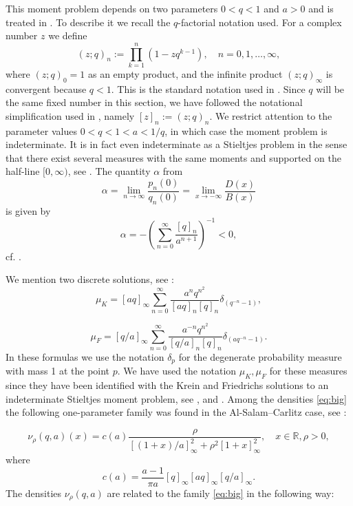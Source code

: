 \documentclass [12pt]{article}
\newcommand{\R}{\mathbb{R}}
\begin{document}
This moment problem depends on two parameters $0<q<1$ and $a>0$ and is treated in \cite{B:V}. To describe it we recall the $q$-factorial notation  used. For a complex number $z$ we define
\begin{equation}
(z;q)_n:=\prod_{k=1}^n(1-zq^{k-1}), \quad n=0,1,\ldots,\infty,
\end{equation}
where $(z;q)_0=1$ as an empty product, and the infinite product $(z;q)_\infty$ is convergent because $q<1$. This is the standard notation used in \cite{G:R}. Since $q$  will be the same fixed number in this section, we have followed the notational simplification used in \cite{B:V}, namely $[z]_n:=(z;q)_n$. We restrict attention to the parameter values 
$0<q<1<a<1/q$, in which case the moment problem is indeterminate. It is in fact even indeterminate as a Stieltjes problem in the sense that there exist several measures with the same moments and supported on the half-line $[0,\infty)$, see \cite[p. 196]{B:V}.
The quantity $\alpha$ from \cite[formula (2.25)]{B:V}
$$
\alpha=\lim_{n\to\infty}\frac{p_n(0)}{q_n(0)}=\lim_{x\to-\infty}\frac{D(x)}{B(x)}
$$
is given by 
$$
\alpha=-\left(\sum_{n=0}^\infty \frac{[q]_n}{a^{n+1}}\right)^{-1}<0,
$$
cf. \cite[p. 200]{B:V}.

 We mention two discrete solutions, see \cite[Proposition 4.5.1]{B:V}:
\begin{equation}\label{eq:K}
\mu_K=[aq]_\infty\sum_{n=0}^\infty \frac{a^nq^{n^2}}{[aq]_n[q]_n}\delta_{(q^{-n}-1)},
\end{equation}

\begin{equation}\label{eq:F}
\mu_F=[q/a]_\infty\sum_{n=0}^\infty \frac{a^{-n}q^{n^2}}{[q/a]_n[q]_n}\delta_{(aq^{-n}-1)}.
\end{equation}
In these formulas we use the notation $\delta_p$ for the degenerate probability measure with mass 1 at the point $p$. We have used the notation $\mu_K,\mu_F$ for these measures  since they have been identified with the Krein and Friedrichs solutions to an indeterminate Stieltjes moment problem, see \cite{Pe}, \cite{B} and \cite[p. 178]{Sch}.
 Among the densities \eqref{eq:big} the following one-parameter family was found in the Al-Salam--Carlitz case, see \cite[Proposition 4.6.1]{B:V}:

\begin{equation}\label{eq:ACcont}
\nu_\rho(q,a)(x)=c(a)\frac{\rho}{[(1+x)/a]_\infty^2+\rho^2 [1+x]_\infty^2},\quad x\in\R, \rho>0,
\end{equation}   
where
\begin{equation}\label{eq:c(a)}
c(a)=\frac{a-1}{\pi a}[q]_\infty [aq]_\infty [q/a]_\infty.
\end{equation}
The densities $\nu_{\rho}(q,a)$ are related to the family \eqref{eq:big} in the following way:
\end{document}
